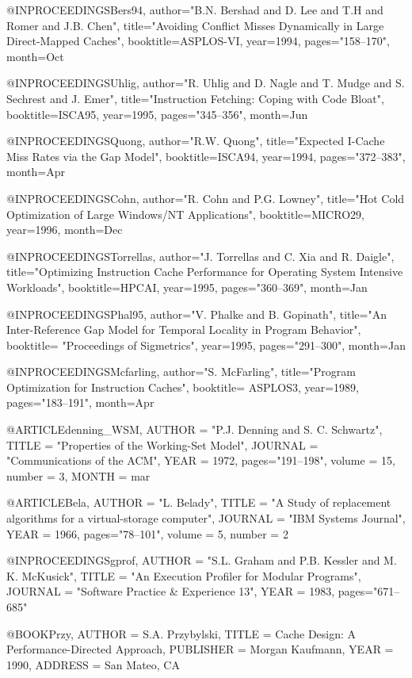 @INPROCEEDINGS{Bers94,	
  author="B.N. Bershad and D. Lee and T.H and Romer and J.B. Chen",
  title="Avoiding Conflict Misses Dynamically in Large Direct-Mapped Caches",
  booktitle=ASPLOS-VI,
  year=1994,
  pages="158--170",
  month=Oct
}

@INPROCEEDINGS{Uhlig,	
  author="R. Uhlig and D. Nagle and T. Mudge and S. Sechrest and J. Emer",
  title="Instruction Fetching: Coping with Code Bloat",
  booktitle=ISCA95,
  year=1995,
  pages="345--356",
  month=Jun
}

@INPROCEEDINGS{Quong,	
  author="R.W. Quong",
  title="Expected {I}-Cache Miss Rates via the Gap Model",
  booktitle=ISCA94,
  year=1994,
  pages="372--383",
  month=Apr
}

@INPROCEEDINGS{Cohn,	
  author="R. Cohn and P.G. Lowney",
  title="Hot Cold Optimization of Large Windows/NT Applications",
  booktitle=MICRO29,
  year=1996,
  month=Dec
}


@INPROCEEDINGS{Torrellas,
  author="J. Torrellas and C. Xia and R. Daigle",
  title="Optimizing Instruction Cache Performance for Operating System Intensive Workloads",
  booktitle=HPCAI,
  year=1995,
  pages="360--369",
  month=Jan
}

@INPROCEEDINGS{Phal95,
  author="V. Phalke and  B. Gopinath",
  title="An Inter-Reference Gap Model for Temporal Locality in Program Behavior", 
  booktitle= "Proceedings of Sigmetrics",
  year=1995,
  pages="291--300",
  month=Jan
}

@INPROCEEDINGS{Mcfarling,
  author="S. McFarling",
  title="Program Optimization for Instruction Caches",
  booktitle= ASPLOS3,
  year=1989,
  pages="183--191",
  month=Apr
}


@ARTICLE{denning_WSM,
	AUTHOR = "P.J. Denning and S. C. Schwartz",
	TITLE = "Properties of the Working-Set Model",
	JOURNAL = "Communications of the ACM",
	YEAR = 1972,
	pages="191--198",
	volume		= 15,
	number		= 3,
	MONTH = mar
}


@ARTICLE{Bela,
	AUTHOR = "L. Belady",
	TITLE = "A Study of replacement algorithms for a virtual-storage computer",
	JOURNAL = "IBM Systems Journal",
	YEAR = 1966,
	pages="78--101",
	volume		= 5,
	number		= 2
}

@INPROCEEDINGS{gprof,
	AUTHOR = "S.L. Graham and P.B. Kessler and M. K. McKusick",
	TITLE = "An Execution Profiler for Modular Programs",
	JOURNAL = "Software Practice \& Experience 13",
	YEAR = 1983,
	pages="671--685"
}


@BOOK{Przy,
	AUTHOR = {S.A. Przybylski},
	TITLE = {Cache Design: A Performance-Directed Approach},
	PUBLISHER = {Morgan Kaufmann},
	YEAR = {1990},
	ADDRESS = {San Mateo, CA}
}


